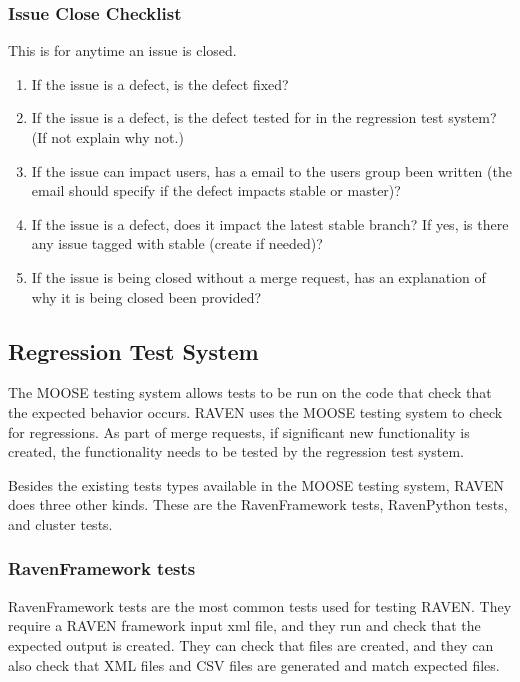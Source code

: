 \documentclass{article}
\begin{document}
\subsubsection{Issue Close Checklist}

This is for anytime an issue is closed.

\begin{enumerate}
\item  If the issue is a defect, is the defect fixed?
\item  If the issue is a defect, is the defect tested for in the regression test system? (If not explain why not.)
\item  If the issue can impact users, has a email to the users group been written (the email should specify if the defect impacts stable or master)?
\item  If the issue is a defect, does it impact the latest stable branch? If yes, is there any issue tagged with stable (create if needed)?
\item  If the issue is being closed without a merge request, has an explanation of why it is being closed been provided?
\end{enumerate}


\subsection{Regression Test System}


The MOOSE testing system allows tests to be run on the code that check
that the expected behavior occurs.  RAVEN uses the MOOSE testing
system to check for regressions.  As part of merge requests, if
significant new functionality is created, the functionality needs to
be tested by the regression test system.

Besides the existing tests types available in the MOOSE testing
system, RAVEN does three other kinds.  These are the RavenFramework
tests, RavenPython tests, and cluster tests.

\subsubsection{RavenFramework tests}

RavenFramework tests are the most common tests used for testing
RAVEN. They require a RAVEN framework input xml file, and they run and
check that the expected output is created.  They can check that files
are created, and they can also check that XML files and CSV files are
generated and match expected files.
\end{document}
